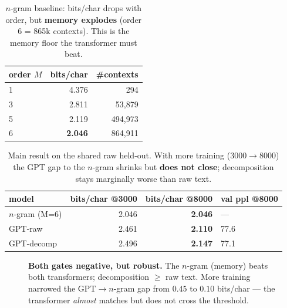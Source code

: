\documentclass[11pt]{article}
\begin{document}
\begin{table}[h]
\centering
\begin{tabular}{lrr}
\toprule
order $M$ & bits/char & \#contexts \\
\midrule
1 & 4.376 & 294 \\
3 & 2.811 & 53{,}879 \\
5 & 2.119 & 494{,}973 \\
6 & \textbf{2.046} & 864{,}911 \\
\bottomrule
\end{tabular}
\caption{$n$-gram baseline: bits/char drops with order, but \textbf{memory explodes} (order 6 = 865k contexts).
This is the memory floor the transformer must beat.}
\end{table}

\begin{table}[h]
\centering
\begin{tabular}{lrrl}
\toprule
model & bits/char @3000 & bits/char @8000 & val ppl @8000 \\
\midrule
$n$-gram (M=6) & 2.046 & \textbf{2.046} & --- \\
GPT-raw        & 2.461 & \textbf{2.110} & 77.6 \\
GPT-decomp     & 2.496 & \textbf{2.147} & 77.1 \\
\bottomrule
\end{tabular}
\caption{Main result on the shared raw held-out. With more training (3000$\to$8000) the GPT gap to the $n$-gram
shrinks but \textbf{does not close}; decomposition stays marginally worse than raw text.}
\end{table}

\begin{figure}[h]
\centering
{}
\caption{\textbf{Both gates negative, but robust.} The $n$-gram (memory) beats both transformers; decomposition
$\geq$ raw text. More training narrowed the GPT$\to$$n$-gram gap from $0.45$ to $0.10$ bits/char --- the transformer
\emph{almost} matches but does not cross the threshold.}
\end{figure}
\end{document}

